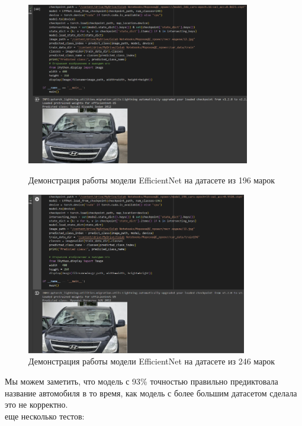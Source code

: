 \documentclass[14pt]{extarticle}
\begin{document}
\begin{figure}[H]
\centering
\begin{minipage}{0.49\textwidth}
  \centering
  \includegraphics[height=7.1cm]{images/20.png}  
  \caption{Демонстрация работы модели \foreignlanguage{english}{EfficientNet} на датасете из 196 марок}
  \label{fig:12}
\end{minipage}
\hfill
\begin{minipage}{0.49\textwidth}
  \centering
  \includegraphics[height=7.1cm]{images/21.png}  
  \caption{Демонстрация работы модели \foreignlanguage{english}{EfficientNet} на датасете из 246 марок}
  \label{fig:13}
\end{minipage}
\end{figure}

Мы можем заметить, что модель с 93\% точностью правильно предиктовала название автомобиля в то время, как модель с более большим датасетом сделала это не корректно.\\
 еще несколько тестов:
\end{document}
